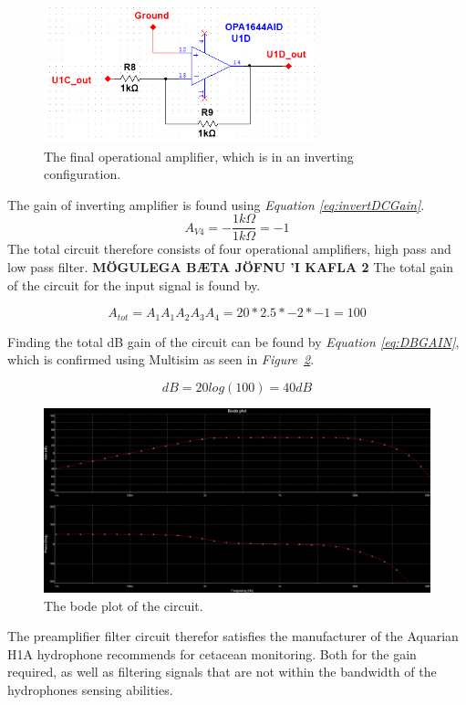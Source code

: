 \begin{figure}[h]
    \centering
    \includegraphics[width=0.70\textwidth]{graphics/OPamp4.png}
    \caption{The final operational amplifier, which is in an inverting configuration.}
    \label{fig:Opamp4}
\end{figure}

The gain of inverting amplifier is found using \textit{Equation \ref{eq:invertDCGain}}.
$$ A_{V4} = -\frac{1k \Omega}{1k \Omega} = -1$$
The total circuit therefore consists of four operational amplifiers, high pass and low pass filter.
\textbf{MÖGULEGA BÆTA JÖFNU 'I KAFLA 2}
The total gain of the circuit for the input signal is found by.

$$A_{tot} = A_1A_1A_2A_3A_4 = 20*2.5*-2*-1 = 100$$

Finding the total dB gain of the circuit can be found by \textit{Equation \ref{eq:DBGAIN}}, which is confirmed using Multisim as seen in \textit{Figure~\ref{fig:bode}}.

$$dB = 20log(100) = 40dB$$


\begin{figure}[h]
    \centering
    \includegraphics[width=1.0\textwidth]{graphics/bodeNew.png}
    \caption{The bode plot of the circuit.}
    \label{fig:bode}
\end{figure}

The preamplifier filter circuit therefor satisfies the manufacturer of the Aquarian H1A hydrophone recommends for cetacean monitoring.
Both for the gain required, as well as filtering signals that are not within the bandwidth of the hydrophones sensing abilities.

